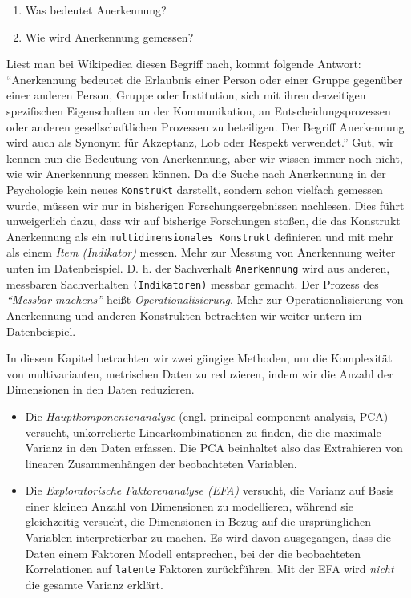 \documentclass[12pt,ngerman,]{book}
\providecommand{\tightlist}{%
  \setlength{\itemsep}{0pt}\setlength{\parskip}{0pt}}
\theoremstyle{definition}
\theoremstyle{definition}
\theoremstyle{remark}
\begin{document}
\begin{enumerate}
\def\labelenumi{\arabic{enumi}.}
\tightlist
\item
  Was bedeutet Anerkennung?
\item
  Wie wird Anerkennung gemessen?
\end{enumerate}

Liest man bei Wikipediea diesen Begriff nach, kommt folgende Antwort:
``Anerkennung bedeutet die Erlaubnis einer Person oder einer Gruppe
gegenüber einer anderen Person, Gruppe oder Institution, sich mit ihren
derzeitigen spezifischen Eigenschaften an der Kommunikation, an
Entscheidungsprozessen oder anderen gesellschaftlichen Prozessen zu
beteiligen. Der Begriff Anerkennung wird auch als Synonym für Akzeptanz,
Lob oder Respekt verwendet.'' Gut, wir kennen nun die Bedeutung von
Anerkennung, aber wir wissen immer noch nicht, wie wir Anerkennung
messen können. Da die Suche nach Anerkennung in der Psychologie kein
neues \texttt{Konstrukt} darstellt, sondern schon vielfach gemessen
wurde, müssen wir nur in bisherigen Forschungsergebnissen nachlesen.
Dies führt unweigerlich dazu, dass wir auf bisherige Forschungen stoßen,
die das Konstrukt Anerkennung als ein
\texttt{multidimensionales\ Konstrukt} definieren und mit mehr als einem
\emph{Item (Indikator)} messen. Mehr zur Messung von
Anerkennung weiter unten im Datenbeispiel. D. h. der Sachverhalt
\texttt{Anerkennung} wird aus anderen, messbaren Sachverhalten
\texttt{(Indikatoren)} messbar gemacht. Der Prozess des \emph{``Messbar
machens''} heißt \emph{Operationalisierung}.
Mehr zur Operationalisierung von Anerkennung und anderen Konstrukten
betrachten wir weiter untern im Datenbeispiel.

In diesem Kapitel betrachten wir zwei gängige Methoden, um die
Komplexität von multivarianten, metrischen Daten zu reduzieren, indem
wir die Anzahl der Dimensionen in den Daten reduzieren.

\begin{itemize}
\tightlist
\item
  Die \emph{Hauptkomponentenanalyse}
  (engl. principal component analysis, PCA) versucht, unkorrelierte
  Linearkombinationen zu finden, die die maximale Varianz in den Daten
  erfassen. Die PCA beinhaltet also das Extrahieren von
  linearen Zusammenhängen der beobachteten Variablen.
\item
  Die \emph{Exploratorische Faktorenanalyse
  (EFA)} versucht, die Varianz
  auf Basis einer kleinen Anzahl von Dimensionen zu modellieren, während
  sie gleichzeitig versucht, die Dimensionen in Bezug auf die
  ursprünglichen Variablen interpretierbar zu machen. Es wird davon
  ausgegangen, dass die Daten einem Faktoren Modell entsprechen, bei der
  die beobachteten Korrelationen auf \texttt{latente} Faktoren
  zurückführen. Mit der EFA wird \emph{nicht} die gesamte Varianz
  erklärt.
\end{itemize}
\end{document}
